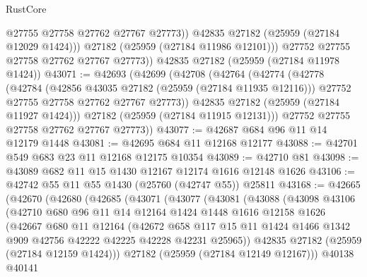 \begin{lexlean}{RustCore}
\begin{coremodule}
                @27755
                @27758
                @27762
                @27767
                @27773))
            @42835
            @27182
            (@25959 (@27184 @12029 @1424)))
          @27182
          (@25959 (@27184 @11986 @12101)))
        @27752
        @27755
        @27758
        @27762
        @27767
        @27773))
    @42835
    @27182
    (@25959 (@27184 @11978 @1424))
@43071 := @42693
    (@42699
      (@42708
        (@42764
          (@42774
            (@42778
              (@42784
                (@42856 @43035 @27182 (@25959 (@27184 @11935 @12116)))
                @27752
                @27755
                @27758
                @27762
                @27767
                @27773))
            @42835
            @27182
            (@25959 (@27184 @11927 @1424)))
          @27182
          (@25959 (@27184 @11915 @12131)))
        @27752
        @27755
        @27758
        @27762
        @27767
        @27773))
@43077 := @42687 @684 @96 @11 @14 @12179 @1448
@43081 := @42695 @684 @11 @12168 @12177
@43088 := @42701 @549 @683 @23 @11 @12168 @12175 @10354
@43089 := @42710 @81
@43098 := @43089 @682 @11 @15 @1430 @12167 @12174 @1616 @12148 @1626
@43106 := @42742 @55 @11 @55 @1430 (@25760 (@42747 @55)) @25811
@43168 := @42665
    (@42670
      (@42680
        (@42685
          (@43071
            (@43077
              (@43081
                (@43088
                  (@43098
                    @43106
                    (@42710
                      @680
                      @96
                      @11
                      @14
                      @12164
                      @1424
                      @1448
                      @1616
                      @12158
                      @1626
                      (@42667
                        @680
                        @11
                        @12164
                        (@42672
                          @658
                          @117
                          @15
                          @11
                          @1424
                          @1466
                          @1342
                          @909
                          @42756
                          @42222
                          @42225
                          @42228
                          @42231
                          @25965))
                      @42835
                      @27182
                      (@25959 (@27184 @12159 @1424)))
                    @27182
                    (@25959 (@27184 @12149 @12167)))
                  @40138
                  @40141

\end{coremodule}
\end{lexlean}
